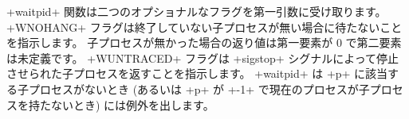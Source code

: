 \ml+waitpid+ 関数は二つのオプショナルなフラグを第一引数に受け取ります。
\ml+WNOHANG+ フラグは終了していない子プロセスが無い場合に待たないことを指示します。
子プロセスが無かった場合の返り値は第一要素が 0 で第二要素は未定義です。
\ml+WUNTRACED+ フラグは \ml+sigstop+ シグナルによって停止させられた子プロセスを返すことを指示します。
\ml+waitpid+ は \ml+p+ に該当する子プロセスがないとき
(あるいは \ml+p+ が \ml+-1+ で現在のプロセスが子プロセスを持たないとき)
には例外を出します。

